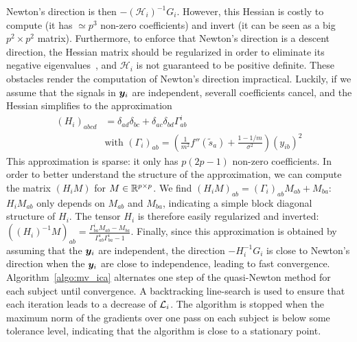 Newton's direction is then $-\left(\mathcal{H}_i\right)^{-1}G_i$. However, this Hessian is costly to compute (it has $\simeq p^3$ non-zero coefficients) and invert (it can be seen as a big $p ^2\times p^2$ matrix). Furthermore, to enforce that Newton's direction is a descent direction, the Hessian matrix should be regularized in order to eliminate its negative eigenvalues~\cite{nocedal2006numerical}, and $\mathcal{H}_i$ is not guaranteed to be positive definite.
%
These obstacles render the computation of Newton's direction impractical.
%
Luckily, if we assume that the signals in $\boldsymbol{y}_i$ are independent, severall coefficients cancel, and the Hessian simplifies to the approximation
\begin{align}
    \label{eq:hessian_approx}
    (H_i)_{abcd} &= \delta_{ad}\delta_{bc} + \delta_{ac}\delta_{bd}\Gamma^i_{ab} \\
    &\text{with  }(\Gamma_i)_{ab} = \left(\frac{1}{m^2}f''(\tilde{s}_a) + \frac{1 - 1/m}{\sigma^2}\right)\left(y_{ib}\right)^2 \nonumber
\end{align}
This approximation is sparse: it only has $p(2p -1)$ non-zero coefficients.
%
In order to better understand the structure of the approximation, we can compute the matrix $\left(H_iM\right)$ for $M\in \mathbb{R}^{p\times p}$. 
%
We find $\left(H_iM\right)_{ab} = (\Gamma_i)_{ab}M_{ab} + M_{ba}$: $H_iM_{ab}$ only depends on $M_{ab}$ and $M_{ba}$, indicating a simple block diagonal structure of $H_i$.
%
The tensor $H_i$ is therefore easily regularized and inverted:
$\left((H_i)^{-1}M\right)_{ab} = \frac{\Gamma^i_{ba}M_{ab} - M_{ba}}{\Gamma^i_{ab}\Gamma^i_{ba} - 1}$.
%
Finally, since this approximation is obtained by assuming that the $\boldsymbol{y}_i$ are independent, the direction $-H_i^{-1}G_i$ is close to Newton's direction when the $\boldsymbol{y}_i$ are close to independence, leading to fast convergence.
%
Algorithm~\ref{algo:mv_ica} alternates one step of the quasi-Newton method for each subject until convergence.
%
A backtracking line-search is used to ensure that each iteration leads to a decrease of $\mathcal{L}_i$.
%
The algorithm is stopped when the maximum norm of the gradients over one pass on each subject is below some tolerance level, indicating that the algorithm is close to a stationary point.

